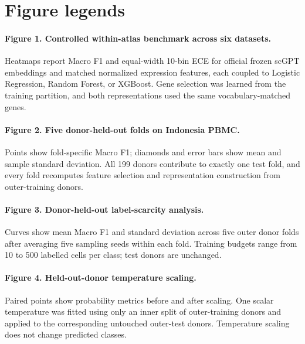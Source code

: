 \clearpage
\section*{Figure legends}

\paragraph{Figure 1. Controlled within-atlas benchmark across six datasets.} Heatmaps report Macro F1 and equal-width 10-bin ECE for official frozen scGPT embeddings and matched normalized expression features, each coupled to Logistic Regression, Random Forest, or XGBoost. Gene selection was learned from the training partition, and both representations used the same vocabulary-matched genes.

\paragraph{Figure 2. Five donor-held-out folds on Indonesia PBMC.} Points show fold-specific Macro F1; diamonds and error bars show mean and sample standard deviation. All 199 donors contribute to exactly one test fold, and every fold recomputes feature selection and representation construction from outer-training donors.

\paragraph{Figure 3. Donor-held-out label-scarcity analysis.} Curves show mean Macro F1 and standard deviation across five outer donor folds after averaging five sampling seeds within each fold. Training budgets range from 10 to 500 labelled cells per class; test donors are unchanged.

\paragraph{Figure 4. Held-out-donor temperature scaling.} Paired points show probability metrics before and after scaling. One scalar temperature was fitted using only an inner split of outer-training donors and applied to the corresponding untouched outer-test donors. Temperature scaling does not change predicted classes.
